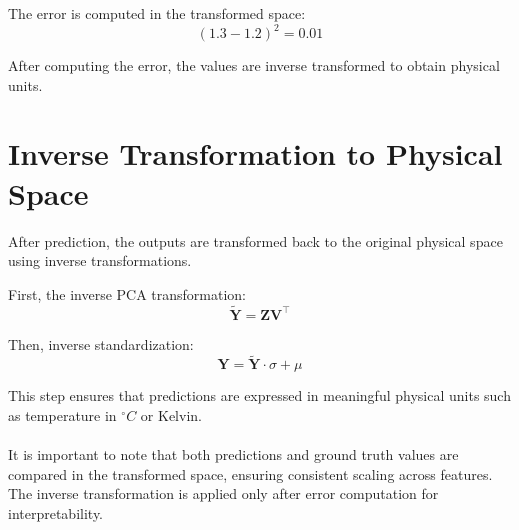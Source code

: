 The error is computed in the transformed space:
\[
(1.3 - 1.2)^2 = 0.01
\]

After computing the error, the values are inverse transformed to obtain physical units.

\section{Inverse Transformation to Physical Space}

After prediction, the outputs are transformed back to the original physical space using inverse transformations.

First, the inverse PCA transformation:
\[
\tilde{\mathbf{Y}} = \mathbf{Z} \mathbf{V}^\top
\]

Then, inverse standardization:
\[
\mathbf{Y} = \tilde{\mathbf{Y}} \cdot \sigma + \mu
\]

This step ensures that predictions are expressed in meaningful physical units such as temperature in \( ^\circ C \) or Kelvin.

\paragraph{}
It is important to note that both predictions and ground truth values are compared in the transformed space, ensuring consistent scaling across features. The inverse transformation is applied only after error computation for interpretability.